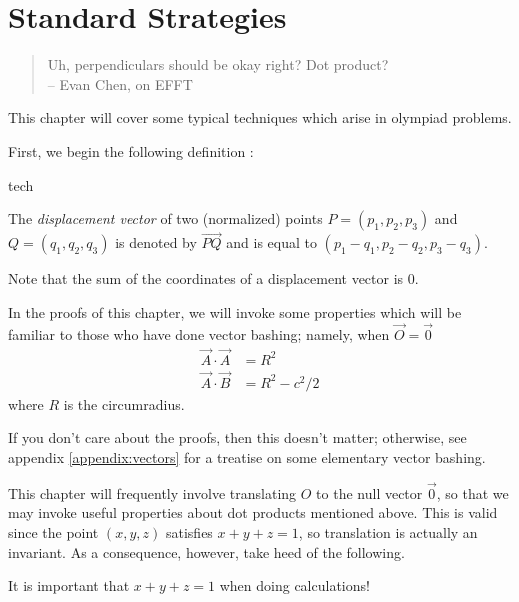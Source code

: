 \chapter{Standard Strategies}
\begin{quote}
  Uh, perpendiculars should be okay right?  Dot product?
  \\ -- Evan Chen, on EFFT
\end{quote}

This chapter will cover some typical techniques which arise in olympiad problems.

First, we begin the following definition \cite{infinity}:
\begin{StoreCode}{tech}
\begin{definition}
  The \textit{displacement vector} of two (normalized) points $P = (p_1, p_2, p_3)$ and $Q = (q_1, q_2, q_3)$ is denoted by $\overrightarrow{PQ}$ and is equal to $(p_1-q_1, p_2-q_2, p_3-q_3)$.
\end{definition}
\end{StoreCode}

Note that the sum of the coordinates of a displacement vector is $0$.

In the proofs of this chapter, we will invoke some properties which will be familiar to those who have done vector bashing; namely, when $\vec O = \vec 0$
\begin{align*}
  \vec A \cdot \vec A &= R^2 \\
  \vec A \cdot \vec B &= R^2-c^2/2
\end{align*}
where $R$ is the circumradius.

If you don't care about the proofs, then this doesn't matter; otherwise, see appendix \ref{appendix:vectors} for a treatise on some elementary vector bashing.

This chapter will frequently involve translating $O$ to the null vector $\vec 0$, so that we may invoke useful properties about dot products mentioned above.  This is valid since the point $(x,y,z)$ satisfies $x+y+z=1$, so translation is actually an invariant.  As a consequence, however, take heed of the following.
\begin{note}
  It is important that $x+y+z=1$ when doing calculations!
\end{note}






